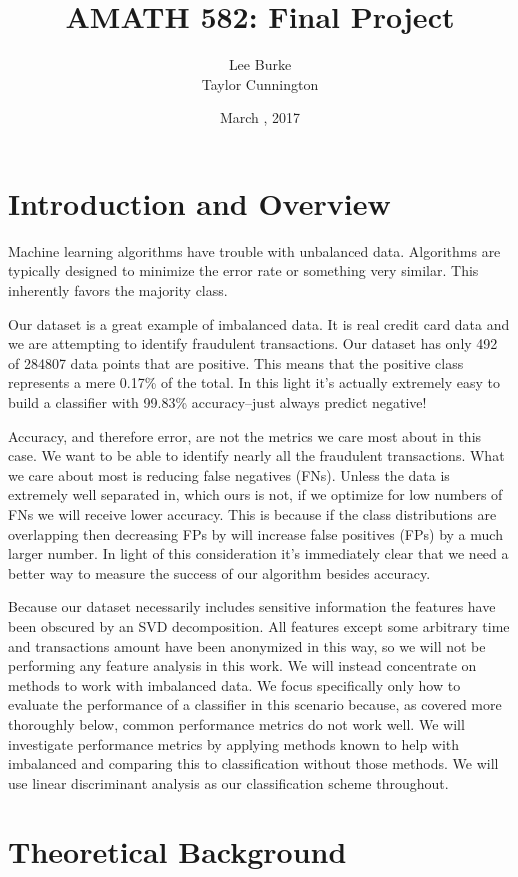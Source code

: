 \documentclass{article}
\title{AMATH 582: Final Project}
\date{March \nth{14}, 2017}
\author{Lee Burke \\ Taylor Cunnington}
\begin{document}
\maketitle
\abstract{
}
\section{Introduction and Overview}
Machine learning algorithms have trouble with unbalanced data.
Algorithms are typically designed to minimize the error rate or something very similar.
This inherently favors the majority class.

Our dataset is a great example of imbalanced data.
It is real credit card data and we are attempting to identify fraudulent transactions.
Our dataset has only 492 of 284807 data points that are positive.
This means that the positive class represents a mere 0.17\% of the total.
In this light it's actually extremely easy to build a classifier with 99.83\% accuracy--just always predict negative!

Accuracy, and therefore error, are not the metrics we care most about in this case.
We want to be able to identify nearly all the fraudulent transactions.
What we care about most is reducing false negatives (FNs).
Unless the data is extremely well separated in, which ours is not, if we optimize for low numbers of FNs we will receive lower accuracy.
This is because if the class distributions are overlapping then decreasing FPs by will increase false positives (FPs) by a much larger number.
In light of this consideration it's immediately clear that we need a better way to measure the success of our algorithm besides accuracy.

Because our dataset necessarily includes sensitive information the features have been obscured by an SVD decomposition.
All features except some arbitrary time and transactions amount have been anonymized in this way, so we will not be performing any feature analysis in this work.
We will instead concentrate on methods to work with imbalanced data.
We focus specifically only how to evaluate the performance of a classifier in this scenario because, as covered more thoroughly below, common performance metrics do not work well.
We will investigate performance metrics by applying methods known to help with imbalanced and comparing this to classification without those methods.
We will use linear discriminant analysis as our classification scheme throughout.

\section{Theoretical Background}
\end{document}
